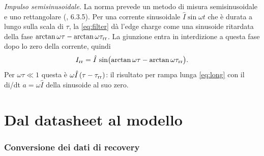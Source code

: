 \documentclass[10pt,a4paper]{scrartcl}
\let\newcommand\pdvaluedefine
\newcommand{\Irr}{I_\mathrm{rr}}
\newcommand{\taurr}{\tau_\mathrm{rr}}
\begin{document}
\emph{Impulso semisinusoidale.} La norma prevede un metodo di misura semisinusoidale e uno rettangolare (\cite{iec60747}, 6.3.5). Per una corrente sinusoidale $\hat I\sin\omega t$ che è durata a lungo sulla scala di $\tau$, la \eqref{eq:filter} dà l'edge charge come una sinusoide ritardata della fase $\arctan\omega\tau - \arctan\omega\taurr$. La giunzione entra in interdizione a questa fase dopo lo zero della corrente, quindi
\begin{equation}
\Irr = \hat I\,\sin\bigl(\arctan\omega\tau - \arctan\omega\taurr\bigr) .
\label{eq:sine}
\end{equation}
Per $\omega\tau \ll 1$ questa è $\omega\hat I\,(\tau-\taurr)$: il risultato per rampa lunga \eqref{eq:long} con il di/dt $a = \omega\hat I$ della sinusoide al suo zero.

\part{Dal datasheet al modello}

\section{Conversione dei dati di recovery}
\label{sec:inverse}
\end{document}
